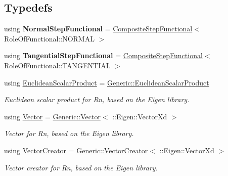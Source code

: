 \subsection*{Typedefs}
\begin{DoxyCompactItemize}
\item 
using {\bfseries Normal\+Step\+Functional} = \hyperlink{classSpacy_1_1Rn_1_1CompositeStepFunctional}{Composite\+Step\+Functional}$<$ Role\+Of\+Functional\+::\+N\+O\+R\+M\+AL $>$\hypertarget{namespaceSpacy_1_1Rn_a8760cfae27d8b8db4387257a3af05592}{}\label{namespaceSpacy_1_1Rn_a8760cfae27d8b8db4387257a3af05592}

\item 
using {\bfseries Tangential\+Step\+Functional} = \hyperlink{classSpacy_1_1Rn_1_1CompositeStepFunctional}{Composite\+Step\+Functional}$<$ Role\+Of\+Functional\+::\+T\+A\+N\+G\+E\+N\+T\+I\+AL $>$\hypertarget{namespaceSpacy_1_1Rn_ad3e3006dbb798bd9f8b8b457b182e8a1}{}\label{namespaceSpacy_1_1Rn_ad3e3006dbb798bd9f8b8b457b182e8a1}

\item 
using \hyperlink{group__EigenGroup_gaf2be4f79056513f7e3e35f7afdc794ee}{Euclidean\+Scalar\+Product} = \hyperlink{classSpacy_1_1Generic_1_1EuclideanScalarProduct}{Generic\+::\+Euclidean\+Scalar\+Product}
\begin{DoxyCompactList}\small\item\em Euclidean scalar product for Rn, based on the Eigen library. \end{DoxyCompactList}\item 
using \hyperlink{group__VectorSpaceGroup_gafda42fd5aa3f7597a42b9831bf4dfd07}{Vector} = \hyperlink{classSpacy_1_1Generic_1_1Vector}{Generic\+::\+Vector}$<$ \+::Eigen\+::\+Vector\+Xd $>$
\begin{DoxyCompactList}\small\item\em Vector for Rn, based on the Eigen library. \end{DoxyCompactList}\item 
using \hyperlink{namespaceSpacy_1_1Rn_ab3b27cb653ec69d12c809394126b046a}{Vector\+Creator} = \hyperlink{classSpacy_1_1Generic_1_1VectorCreator}{Generic\+::\+Vector\+Creator}$<$ \+::Eigen\+::\+Vector\+Xd $>$\hypertarget{namespaceSpacy_1_1Rn_ab3b27cb653ec69d12c809394126b046a}{}\label{namespaceSpacy_1_1Rn_ab3b27cb653ec69d12c809394126b046a}

\begin{DoxyCompactList}\small\item\em Vector creator for Rn, based on the Eigen library. \end{DoxyCompactList}\end{DoxyCompactItemize}
